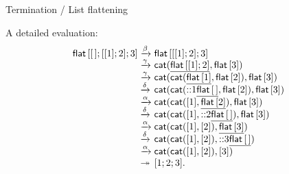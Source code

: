 %
\begin{frame}{Termination / List flattening}

  A detailed evaluation:
    \begin{equation*}
      \begin{array}{r@{\;}l@{\;}l}
        \fun{flat}\,[\el;[[1];2];3]
        & \xrightarrow{\beta}
        & \fun{flat}\,[[[1];2];3]\\
        & \smashedrightarrow{\gamma}
        & \fun{cat}(\underline{\fun{flat}\,[[1];2]},\fun{flat}\,[3])\\
        & \smashedrightarrow{\gamma}
        & \fun{cat}(\fun{cat}(\underline{\fun{flat}\,[1]},\fun{flat}\,[2]),
        \fun{flat}\,[3])\\
        & \smashedrightarrow{\delta}
        & \fun{cat}(\fun{cat}(\cons{1}{\underline{\fun{flat}\,\el}},
        \fun{flat}\,[2]), \fun{flat}\,[3])\\
        & \smashedrightarrow{\alpha}
        & \fun{cat}(\fun{cat}([1],\underline{\fun{flat}\,[2]}),
        \fun{flat}\,[3])\\
        & \smashedrightarrow{\delta}
        & \fun{cat}(\fun{cat}([1],\cons{2}{\underline{\fun{flat}\,\el}}),
        \fun{flat}\,[3])\\
        & \smashedrightarrow{\alpha}
        & \fun{cat}(\fun{cat}([1],[2]),\underline{\fun{flat}\,[3]})\\
        & \smashedrightarrow{\delta}
        & \fun{cat}(\fun{cat}([1],[2]),\cons{3}{\underline{\fun{flat}\,\el}})\\
        & \smashedrightarrow{\alpha}
        & \fun{cat}(\fun{cat}([1],[2]),[3])\\
        & \twoheadrightarrow & [1;2;3].
      \end{array}
    \end{equation*}

\end{frame}

